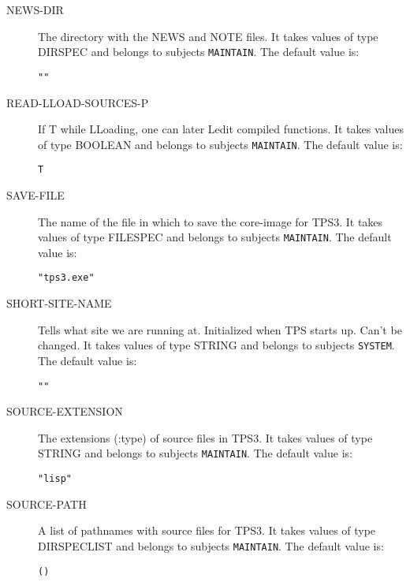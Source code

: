 \begin{description}
\item[NEWS-DIR]  
The directory with the NEWS and NOTE files.
It takes values of type DIRSPEC and belongs to subjects \texttt{MAINTAIN}.  The default value is: \begin{lstlisting}
""
\end{lstlisting}

\item[READ-LLOAD-SOURCES-P]  
If T while LLoading, one can later Ledit compiled functions.
It takes values of type BOOLEAN and belongs to subjects \texttt{MAINTAIN}.  The default value is: \begin{lstlisting}
T
\end{lstlisting}

\item[SAVE-FILE]  
The name of the file in which to save the core-image for TPS3.
It takes values of type FILESPEC and belongs to subjects \texttt{MAINTAIN}.  The default value is: \begin{lstlisting}
"tps3.exe"
\end{lstlisting}

\item[SHORT-SITE-NAME]  
Tells what site we are running at.  Initialized
when TPS starts up.  Can't be changed.
It takes values of type STRING and belongs to subjects \texttt{SYSTEM}.  The default value is: \begin{lstlisting}
""
\end{lstlisting}

\item[SOURCE-EXTENSION]  
The extensions (:type) of source files in TPS3.
It takes values of type STRING and belongs to subjects \texttt{MAINTAIN}.  The default value is: \begin{lstlisting}
"lisp"
\end{lstlisting}

\item[SOURCE-PATH]  
A list of pathnames with source files for TPS3.
It takes values of type DIRSPECLIST and belongs to subjects \texttt{MAINTAIN}.  The default value is: \begin{lstlisting}
()
\end{lstlisting}


\end{description}
